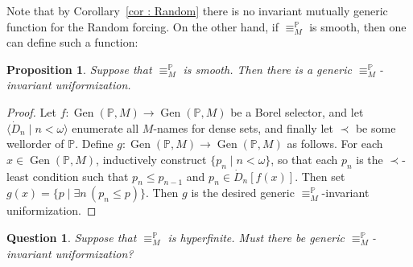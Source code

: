 \documentclass{amsart}
\newcommand{\Gen}{\operatorname{Gen}}
\newtheorem{proposition}[theorem]{Proposition}
\newtheorem{question}[theorem]{Question}
\theoremstyle{definition}
\theoremstyle{remark}
\begin{document}
Note that by Corollary~\ref{cor : Random} there is no invariant mutually generic function for the Random forcing.  On the other hand, if  $\equiv_M^{\mathbb{P}}$ is smooth, then one can define such a function:

\begin{proposition}
     Suppose that  $\equiv_M^{\mathbb{P}}$ is smooth. Then there is a  generic \(\equiv^\mathbb{P}_M\)-invariant uniformization.
\end{proposition}
\begin{proof}
    Let $f\colon\Gen(\mathbb{P}, M) \rightarrow \Gen(\mathbb{P}, M)$ be a Borel selector, and let $\langle\dot{D}_n\mid n<\omega\rangle$ enumerate all $M$-names for dense sets, and finally let $\prec$ be some wellorder of $\mathbb{P}$. Define $g\colon \Gen(\mathbb{P}, M) \rightarrow \Gen(\mathbb{P}, M)$ as follows. For each $x\in \Gen(\mathbb{P}, M)$, inductively construct $\{p_n\mid n<\omega\}$, so that each $p_n$ is the $\prec$-least condition such that $p_n\leq p_{n-1}$ and $p_n\in \dot{D}_n[f(x)]$. Then set $g(x) = \{p\mid \exists n\, (p_n\leq p)\}$. Then $g$ is the desired generic \(\equiv^\mathbb{P}_M\)-invariant uniformization.
\end{proof}


\begin{question}
    Suppose that $\equiv_M^{\mathbb{P}}$ is hyperfinite. Must there be generic $\equiv^\mathbb{P}_M$-invariant uniformization?
\end{question}
\end{document}
